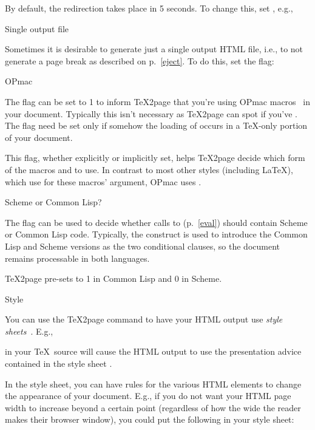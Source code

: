 By default, the redirection takes place in 5 seconds. To change
this, set \p{\TZPredirectseconds}, e.g.,


\beginsection Single output file

%
Sometimes it is desirable to generate just a single output HTML
file, i.e., to not generate a page break as described on
p.~\ref{eject}. To do this, set the \p{\TZPsinglepage} flag:


\beginsection OPmac

The flag \p{\TZPopmac} can be set to 1 to inform \TeX2page that
you’re using OPmac macros~\cite{opmac} in your document.
Typically this isn't necessary as \TeX2page can spot if you’ve
\p{}. The flag need be set only if somehow the
loading of  occurs in a \TeX-only portion of your
document.

This flag, whether explicitly or implicitly set, helps \TeX2page
decide which form of the macros \p{\cite} and \p{\nocite} to use.
In contrast to most other styles (including \LaTeX), which use
\p{{}} for these macros' argument, OPmac uses \p{[]}.

\beginsection Scheme or Common Lisp?

The flag \p{\TZPcommonlisp} can be used to decide whether calls to
\p{\eval} (p.~\ref{eval}) should contain Scheme or Common Lisp code.
Typically, the construct  is used to introduce
the Common Lisp and Scheme versions as the two conditional clauses, so
the document remains processable in both languages.

\TeX2page pre-sets \p{\TZPcommonlisp} to 1 in Common Lisp and 0 in Scheme.

 Style

%
You can use the \TeX2page command  to have your HTML output use {\em style
sheets}~\cite{w3c:css,lb:css,htmlhelp:css}.  E.g.,


\n in your \TeX\ source will cause the HTML output to
use the presentation advice contained in the
style sheet .

In the style sheet, you can have rules for the various
HTML elements to change the appearance of your
document.  E.g., if you do not want your HTML page
width to increase beyond a certain point (regardless of
how the wide the reader makes their browser window),
you could put the following in your style sheet:


